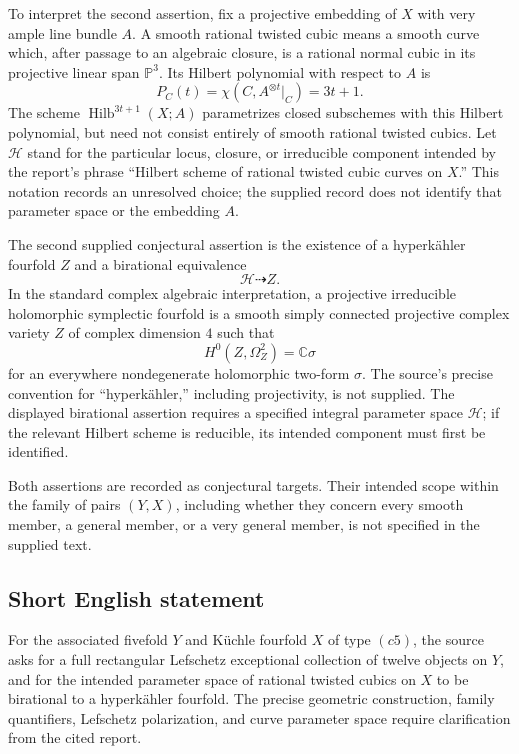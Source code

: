 \documentclass[11pt]{article}
\newcommand{\C}{\mathbb{C}}
\newcommand{\PP}{\mathbb{P}}
\begin{document}
To interpret the second assertion, fix a projective embedding of \(X\) with very ample line bundle \(A\). A smooth rational twisted cubic means a smooth curve which, after passage to an algebraic closure, is a rational normal cubic in its projective linear span \(\PP^3\). Its Hilbert polynomial with respect to \(A\) is
\[
P_C(t)=\chi(C,A^{\otimes t}|_C)=3t+1.
\]
The scheme \(\operatorname{Hilb}^{3t+1}(X;A)\) parametrizes closed subschemes with this Hilbert polynomial, but need not consist entirely of smooth rational twisted cubics. Let \(\mathscr H\) stand for the particular locus, closure, or irreducible component intended by the report's phrase ``Hilbert scheme of rational twisted cubic curves on \(X\).'' This notation records an unresolved choice; the supplied record does not identify that parameter space or the embedding \(A\).

The second supplied conjectural assertion is the existence of a hyperk\"ahler fourfold \(Z\) and a birational equivalence
\[
\mathscr H\dashrightarrow Z.
\]
In the standard complex algebraic interpretation, a projective irreducible holomorphic symplectic fourfold is a smooth simply connected projective complex variety \(Z\) of complex dimension \(4\) such that
\[
H^0(Z,\Omega_Z^2)=\C\sigma
\]
for an everywhere nondegenerate holomorphic two-form \(\sigma\). The source's precise convention for ``hyperk\"ahler,'' including projectivity, is not supplied. The displayed birational assertion requires a specified integral parameter space \(\mathscr H\); if the relevant Hilbert scheme is reducible, its intended component must first be identified.

Both assertions are recorded as conjectural targets. Their intended scope within the family of pairs \((Y,X)\), including whether they concern every smooth member, a general member, or a very general member, is not specified in the supplied text.
\subsection{Short English statement}
For the associated fivefold \(Y\) and K\"uchle fourfold \(X\) of type \((c5)\), the source asks for a full rectangular Lefschetz exceptional collection of twelve objects on \(Y\), and for the intended parameter space of rational twisted cubics on \(X\) to be birational to a hyperk\"ahler fourfold. The precise geometric construction, family quantifiers, Lefschetz polarization, and curve parameter space require clarification from the cited report.
\end{document}
